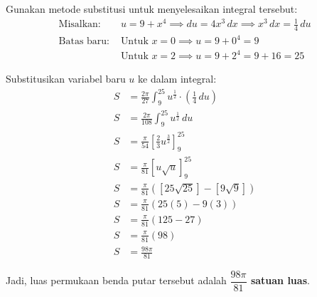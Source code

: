 \documentclass[12pt,a4paper]{article}
\begin{document}
Gunakan metode substitusi untuk menyelesaikan integral tersebut:
\begin{align*}
  \text{Misalkan: } & u = 9 + x^4 \implies du = 4x^3 \, dx \implies x^3 \, dx = \frac{1}{4} \, du \\
  \text{Batas baru: } & \text{Untuk } x = 0 \implies u = 9 + 0^4 = 9 \\
  & \text{Untuk } x = 2 \implies u = 9 + 2^4 = 9 + 16 = 25
\end{align*}

Substitusikan variabel baru $u$ ke dalam integral:
\begin{align*}
  S &= \frac{2\pi}{27} \int_{9}^{25} u^{\frac{1}{2}} \cdot \left(\frac{1}{4} \, du\right) \\
  S &= \frac{2\pi}{108} \int_{9}^{25} u^{\frac{1}{2}} \, du \\
  S &= \frac{\pi}{54} \left[ \frac{2}{3}u^{\frac{3}{2}} \right]_{9}^{25} \\
  S &= \frac{\pi}{81} \left[ u\sqrt{u} \right]_{9}^{25} \\
  S &= \frac{\pi}{81} \left( \left[ 25\sqrt{25} \right] - \left[ 9\sqrt{9} \right] \right) \\
  S &= \frac{\pi}{81} \left( 25(5) - 9(3) \right) \\
  S &= \frac{\pi}{81} (125 - 27) \\
  S &= \frac{\pi}{81} (98) \\
  S &= \frac{98\pi}{81}
\end{align*}

Jadi, luas permukaan benda putar tersebut adalah \textbf{$\dfrac{98\pi}{81}$ satuan luas}.
\end{document}
